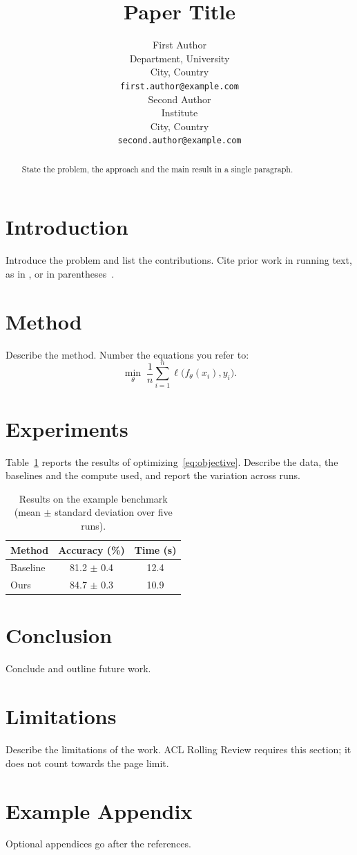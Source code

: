 \documentclass[11pt]{article}
\title{Paper Title}
\author{First Author \\
  Department, University \\
  City, Country \\
  \texttt{first.author@example.com} \\\And
  Second Author \\
  Institute \\
  City, Country \\
  \texttt{second.author@example.com} \\}
\begin{document}
\maketitle

\begin{abstract}
State the problem, the approach and the main result in a single
paragraph.
\end{abstract}

\section{Introduction}
Introduce the problem and list the contributions. Cite prior work in
running text, as in \citet{knuth1984texbook}, or in
parentheses~\citep{lamport1994latex}.

\section{Method}
Describe the method. Number the equations you refer to:
\begin{equation}
  \label{eq:objective}
  \min_{\theta} \; \frac{1}{n} \sum_{i=1}^{n} \ell\bigl(f_\theta(x_i), y_i\bigr) .
\end{equation}

\section{Experiments}
Table~\ref{tab:results} reports the results of
optimizing~\eqref{eq:objective}. Describe the data, the baselines and the
compute used, and report the variation across runs.

\begin{table}[!htb]
  \caption{Results on the example benchmark (mean $\pm$ standard deviation over five runs).}
  \label{tab:results}
  \centering
  \begin{tabular}{lcc}
    \toprule
    Method   & Accuracy (\%)  & Time (s) \\
    \midrule
    Baseline & 81.2 $\pm$ 0.4 & 12.4     \\
    Ours     & 84.7 $\pm$ 0.3 & 10.9     \\
    \bottomrule
  \end{tabular}
\end{table}

\section{Conclusion}
Conclude and outline future work.

\section*{Limitations}
Describe the limitations of the work. ACL Rolling Review requires this
section; it does not count towards the page limit.



\appendix
\section{Example Appendix}
Optional appendices go after the references.
\end{document}

